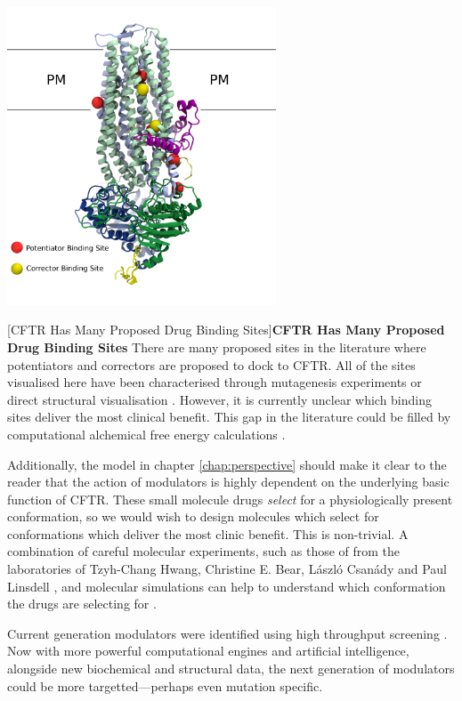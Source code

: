 \begin{center}
	\includegraphics[width=0.6\textwidth]{figures/many_drug_sites.pdf}
\end{center}
\begingroup
\captionsetup{singlelinecheck = false, justification=raggedright}
[CFTR Has Many Proposed Drug Binding Sites]{\textbf{CFTR Has Many Proposed Drug Binding Sites} {There are many proposed sites in the literature where potentiators and correctors are proposed to dock to CFTR. All of the sites visualised here have been characterised through mutagenesis experiments or direct structural visualisation \cite{yeh2019, laselva2021a, liu2019, baatallah2021}. However, it is currently unclear which binding sites deliver the most clinical benefit. This gap in the literature could be filled by computational alchemical free energy calculations \cite{jorgensen2008,chipot2007}. }}
\label{many_drug_bound_CFTR}
\endgroup


Additionally, the model in chapter \ref{chap:perspective} should make it clear to the reader that the action of modulators is highly dependent on the underlying basic function of CFTR. These small molecule drugs \textit{select} for a physiologically present conformation, so we would wish to design molecules which select for conformations which deliver the most clinic benefit. This is non-trivial. A combination of careful molecular experiments, such as those of from the laboratories of Tzyh-Chang Hwang,  Christine E. Bear, L\'aszl\'o Csan\'ady and Paul Linsdell \cite{linsdell2018, csanady2019, laselva2022, zhang2017b}, and molecular simulations can help to understand which conformation the drugs are selecting for \cite{laselva2021a}.

Current generation modulators were identified using high throughput screening \cite{vangoor2009}. Now with more powerful computational engines and artificial intelligence, alongside new biochemical and structural data, the next generation of modulators could be more targetted---perhaps even mutation specific.

